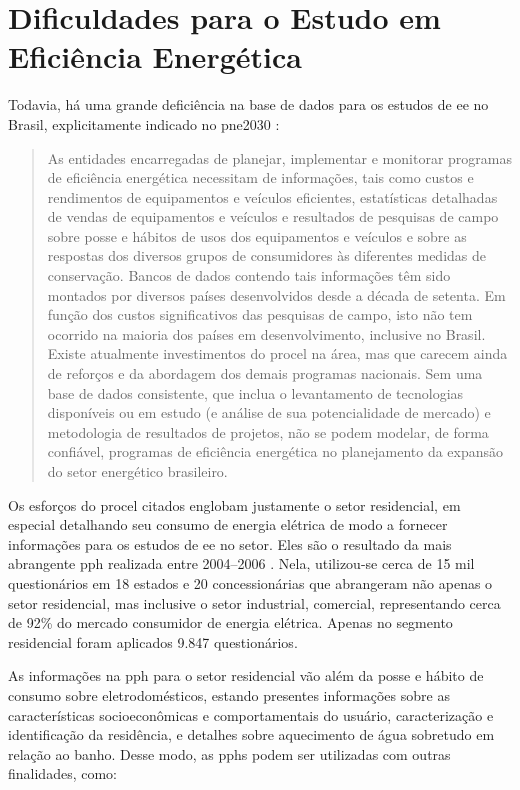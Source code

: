 \section{Dificuldades para o Estudo em Eficiência Energética}
\label{sec:ee_dificuldades}

Todavia, há uma grande deficiência na base de dados para os estudos de \gls{ee} no
Brasil, explicitamente indicado no \gls{pne2030} \cite[p.~232]{pne30_eff_energ}:

\begin{quote}
As entidades encarregadas de planejar, implementar e monitorar programas de
eficiência energética necessitam de informações, tais como custos e
rendimentos de equipamentos e veículos eficientes, estatísticas detalhadas de
vendas de equipamentos e veículos e resultados de pesquisas de campo sobre posse
e hábitos de usos dos equipamentos e veículos e sobre as respostas dos diversos
grupos de consumidores às diferentes medidas de conservação. Bancos de dados
contendo tais informações têm sido montados por diversos países desenvolvidos
desde a década de setenta. Em função dos custos significativos das pesquisas de
campo, isto não tem ocorrido na maioria dos países em desenvolvimento, inclusive
no Brasil. Existe atualmente investimentos do \gls{procel} na área, mas que carecem
ainda de reforços e da abordagem dos demais programas nacionais. Sem uma base de
dados consistente, que inclua o levantamento de tecnologias disponíveis ou em
estudo (e análise de sua potencialidade de mercado) e metodologia de resultados
de projetos, não se podem modelar, de forma confiável, programas de eficiência
energética no planejamento da expansão do setor energético brasileiro.
\end{quote}

Os esforços do \gls{procel} citados englobam justamente o setor residencial, em
especial detalhando seu consumo de energia elétrica de modo a fornecer informações 
para os estudos de \gls{ee} no setor. Eles são o resultado da mais abrangente
\gls{pph} realizada entre 2004--2006 \cite{result_procel_2005,site_pesquisas_procel}. 
Nela, utilizou-se cerca de 15 mil questionários em 18 estados e 20 concessionárias que 
abrangeram não apenas o setor residencial, mas inclusive o setor industrial, comercial, 
representando cerca de 92\% do mercado consumidor de energia elétrica. 
Apenas no segmento residencial foram aplicados 9.847 questionários.  

As informações na \gls{pph} para o setor residencial vão além da posse e hábito 
de consumo sobre eletrodomésticos, estando presentes informações sobre as
características socioeconômicas e comportamentais do usuário, caracterização e
identificação da residência, e detalhes sobre aquecimento de água sobretudo em
relação ao banho. Desse modo, as \glspl{pph} podem ser utilizadas com outras
finalidades, como:

